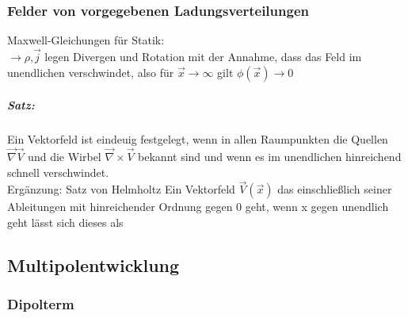 \documentclass[a4paper]{article}
\begin{document}
\subsubsection{Felder von vorgegebenen Ladungsverteilungen}
Maxwell-Gleichungen für Statik:\\
$\rightarrow \rho$,$\vec{j}$ legen Divergen und Rotation mit der Annahme, dass
das Feld im unendlichen verschwindet, also für $\vec{x}\rightarrow\infty$ gilt
$\phi(\vec{x})\rightarrow0$
\subparagraph{Satz:}
Ein Vektorfeld ist eindeuig festgelegt, wenn in allen Raumpunkten die Quellen
$\vec{\nabla}\vec{V}$ und die Wirbel $\vec{\nabla}\times\vec{V}$ bekannt sind
und wenn es im unendlichen hinreichend schnell verschwindet.\\ 
Ergänzung: Satz von Helmholtz
Ein Vektorfeld $\vec{V}(\vec{x})$ das einschließlich seiner Ableitungen mit
hinreichender Ordnung gegen 0 geht, wenn x gegen unendlich geht lässt sich
dieses als 



\subsection{Multipolentwicklung}
\subsubsection{Dipolterm}
\end{document}
